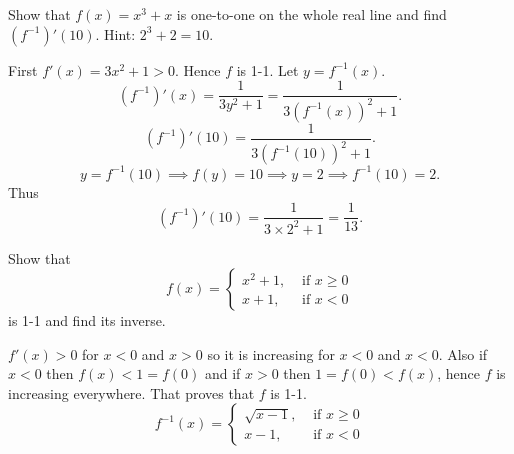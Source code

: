 \documentclass[../main.tex]{subfiles}
\begin{document}
\begin{example}
    Show that $f(x) = x^3 + x$ is one-to-one on the whole real line and find $(f^{-1})'(10)$. Hint: $2^3 + 2 = 10$.
\end{example}
\begin{solution}
    First $f'(x) = 3x^2 + 1 >0$. Hence $f$ is 1-1.
    Let $y = f^{-1}(x)$.
    \[
        (f^{-1})'(x) = \frac{1}{3 y^2 + 1} = \frac{1}{3 (f^{-1}(x))^2 + 1}.
    \]
    \[
        (f^{-1})'(10) = \frac{1}{3 (f^{-1}(10))^2 + 1}.
    \]
    \[
        y = f^{-1}(10) \implies f(y) = 10 \implies y = 2 \implies f^{-1}(10) = 2.
    \]
    Thus
    \[
        (f^{-1})'(10) = \frac{1}{3\times2^2 + 1} = \frac{1}{13}.
    \]
\end{solution}

\begin{example}[OPTIONAL]
    Show that
    \[
        f(x) =
        \begin{cases}
            x^2+1, &\text{ if } x \geq 0\\
            x+1, &\text{ if } x < 0
        \end{cases}
    \]
    is 1-1 and find its inverse.
\end{example}
\begin{solution}
    $f'(x) > 0$ for $x<0$ and $x>0$ so it is increasing for $x<0$ and $x<0$. Also if $x<0$ then $f(x) < 1 = f(0)$ and if $x>0$ then $1 = f(0) < f(x)$, hence $f$ is increasing everywhere. That proves that $f$ is 1-1.
    \[
        f^{-1}(x) =
        \begin{cases}
            \sqrt{x-1}, &\text{ if } x \geq 0\\
            x-1, &\text{ if } x < 0
        \end{cases}
    \]
\end{solution}
\end{document}
